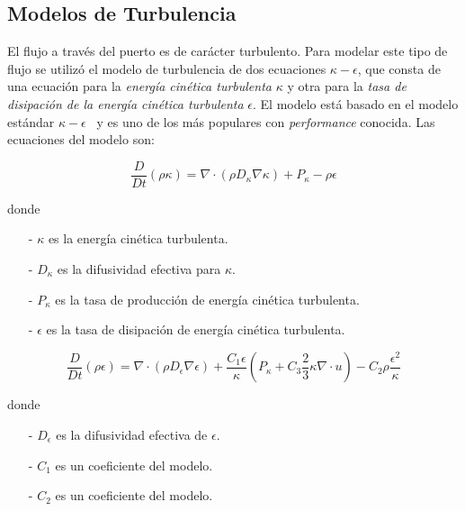 \subsection{Modelos de Turbulencia}
%
El flujo a través del puerto es de carácter turbulento.
%
Para modelar este tipo de flujo se utilizó el modelo de turbulencia de dos
ecuaciones \emph{$\kappa-\epsilon$}\parencite{wilcox}, que consta de una
ecuación para la \emph{energía cinética turbulenta} $\kappa$ y otra para la
\emph{tasa de disipación de la energía cinética turbulenta} $\epsilon$.
%
El modelo está basado en el modelo estándar
$\kappa-\epsilon$~\parencite{launderSpalding} y es uno de los más populares con
\emph{performance} conocida.
%
Las ecuaciones del modelo son:

\begin{equation}\label{eq:k} \frac{D}{Dt}(\rho \kappa) = \nabla \cdot (\rho D_{\kappa}\nabla \kappa) + P_{\kappa} - \rho \epsilon
\end{equation}

    

donde

\begin{itemize}
  \item[-] $\kappa$ es la energía cinética turbulenta.
  \item[-] $D_{\kappa}$ es la difusividad efectiva para $\kappa$.
  \item[-] $P_{\kappa}$ es la tasa de producción de energía cinética turbulenta.
  \item[-] $\epsilon$ es la tasa de disipación de energía cinética turbulenta.
\end{itemize}


\begin{equation}\label{eq:k} \frac{D}{Dt}(\rho \epsilon) = \nabla \cdot (\rho D_{\epsilon}\nabla \epsilon) + \frac{C_{1}\epsilon}{\kappa} \left( P_{\kappa}+C_{3}\frac{2}{3}\kappa\nabla\cdot u \right) - C_{2}\rho\frac{\epsilon^{2}}{\kappa}
\end{equation}

donde
\begin{itemize}
  \item[-] $D_{\epsilon}$ es la difusividad efectiva de $\epsilon$.
  \item[-] $C_{1}$ es un coeficiente del modelo.
  \item[-] $C_{2}$ es un coeficiente del modelo.
\end{itemize}

